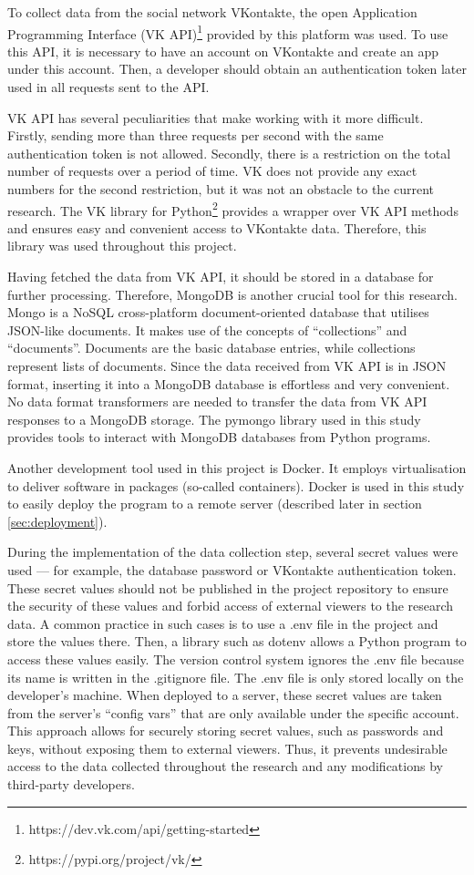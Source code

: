 To collect data from the social network VKontakte, the open Application Programming Interface (VK API)\footnote{https://dev.vk.com/api/getting-started} provided by this platform was used. To use this API, it is necessary to have an account on VKontakte and create an app under this account. Then, a developer should obtain an authentication token later used in all requests sent to the API.

VK API has several peculiarities that make working with it more difficult. Firstly, sending more than three requests per second with the same authentication token is not allowed. Secondly, there is a restriction on the total number of requests over a period of time. VK does not provide any exact numbers for the second restriction, but it was not an obstacle to the current research. The VK library for Python\footnote{https://pypi.org/project/vk/} provides a wrapper over VK API methods and ensures easy and convenient access to VKontakte data. Therefore, this library was used throughout this project.

Having fetched the data from VK API, it should be stored in a database for further processing. Therefore, MongoDB is another crucial tool for this research. Mongo is a NoSQL cross-platform document-oriented database that utilises JSON-like documents. It makes use of the concepts of ``collections'' and ``documents''. Documents are the basic database entries, while collections represent lists of documents. Since the data received from VK API is in JSON format, inserting it into a MongoDB database is effortless and very convenient. No data format transformers are needed to transfer the data from VK API responses to a MongoDB storage. The pymongo library used in this study provides tools to interact with MongoDB databases from Python programs.

Another development tool used in this project is Docker. It employs virtualisation to deliver software in packages (so-called containers). Docker is used in this study to easily deploy the program to a remote server (described later in section \ref{sec:deployment}).

During the implementation of the data collection step, several secret values were used — for example, the database password or VKontakte authentication token. These secret values should not be published in the project repository to ensure the security of these values and forbid access of external viewers to the research data. A common practice in such cases is to use a .env file in the project and store the values there. Then, a library such as dotenv allows a Python program to access these values easily. The version control system ignores the .env file because its name is written in the .gitignore file. The .env file is only stored locally on the developer’s machine. When deployed to a server, these secret values are taken from the server’s ``config vars'' that are only available under the specific account. This approach allows for securely storing secret values, such as passwords and keys, without exposing them to external viewers. Thus, it prevents undesirable access to the data collected throughout the research and any modifications by third-party developers.

